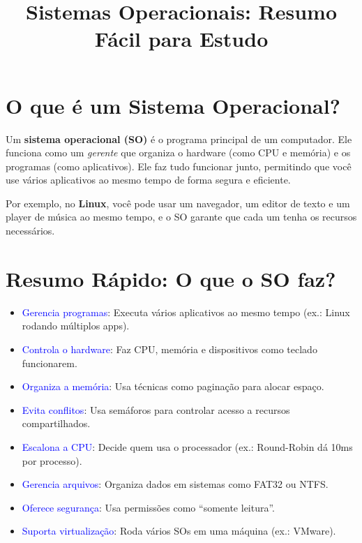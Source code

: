 \documentclass[a4paper,12pt]{article}
\begin{document}
\title{\textbf{Sistemas Operacionais: Resumo Fácil para Estudo}}
\author{}
\date{}
\maketitle

\section*{O que é um Sistema Operacional?}

Um \textbf{sistema operacional (SO)} é o programa principal de um computador. Ele funciona como um \textit{gerente} que organiza o hardware (como CPU e memória) e os programas (como aplicativos). Ele faz tudo funcionar junto, permitindo que você use vários aplicativos ao mesmo tempo de forma segura e eficiente.

Por exemplo, no \textbf{Linux}, você pode usar um navegador, um editor de texto e um player de música ao mesmo tempo, e o SO garante que cada um tenha os recursos necessários.

\section*{Resumo Rápido: O que o SO faz?}

\begin{itemize}[label=$\bullet$]
    \item \textcolor{blue}{Gerencia programas}: Executa vários aplicativos ao mesmo tempo (ex.: Linux rodando múltiplos apps).
    \item \textcolor{blue}{Controla o hardware}: Faz CPU, memória e dispositivos como teclado funcionarem.
    \item \textcolor{blue}{Organiza a memória}: Usa técnicas como paginação para alocar espaço.
    \item \textcolor{blue}{Evita conflitos}: Usa semáforos para controlar acesso a recursos compartilhados.
    \item \textcolor{blue}{Escalona a CPU}: Decide quem usa o processador (ex.: Round-Robin dá 10ms por processo).
    \item \textcolor{blue}{Gerencia arquivos}: Organiza dados em sistemas como FAT32 ou NTFS.
    \item \textcolor{blue}{Oferece segurança}: Usa permissões como ``somente leitura''.
    \item \textcolor{blue}{Suporta virtualização}: Roda vários SOs em uma máquina (ex.: VMware).
\end{itemize}
\end{document}
